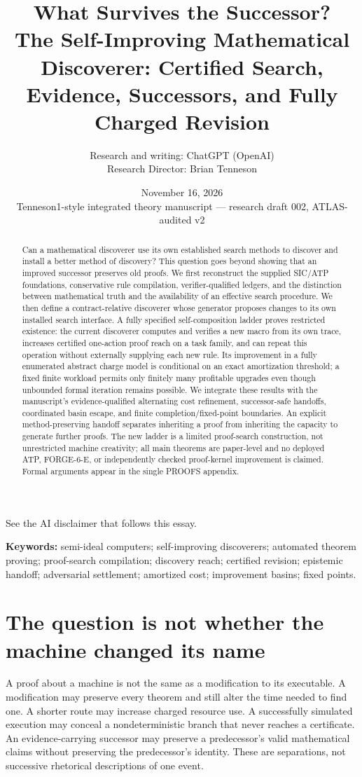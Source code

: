 \documentclass[11pt,letterpaper]{article}
\title{\bfseries What Survives the Successor?\\[4pt]
\large The Self-Improving Mathematical Discoverer: Certified Search, Evidence, Successors, and Fully Charged Revision}
\author{Research and writing: ChatGPT (OpenAI)\\[3pt]
\small Research Director: Brian Tenneson}
\date{November 16, 2026\\\small Tenneson1-style integrated theory manuscript --- research draft 002, ATLAS-audited v2}
\theoremstyle{definition}
\theoremstyle{remark}
\begin{document}
\maketitle
\begin{center}\normalsize See the AI disclaimer that follows this essay.\end{center}
\begin{abstract}
Can a mathematical discoverer use its own established search methods to discover and install a better method of discovery? This question goes beyond showing that an improved successor preserves old proofs. We first reconstruct the supplied SIC/ATP foundations, conservative rule compilation, verifier-qualified ledgers, and the distinction between mathematical truth and the availability of an effective search procedure. We then define a contract-relative discoverer whose generator proposes changes to its own installed search interface. A fully specified self-composition ladder proves restricted existence: the current discoverer computes and verifies a new macro from its own trace, increases certified one-action proof reach on a task family, and can repeat this operation without externally supplying each new rule. Its improvement in a fully enumerated abstract charge model is conditional on an exact amortization threshold; a fixed finite workload permits only finitely many profitable upgrades even though unbounded formal iteration remains possible. We integrate these results with the manuscript's evidence-qualified alternating cost refinement, successor-safe handoffs, coordinated basin escape, and finite completion/fixed-point boundaries. An explicit method-preserving handoff separates inheriting a proof from inheriting the capacity to generate further proofs. The new ladder is a limited proof-search construction, not unrestricted machine creativity; all main theorems are paper-level and no deployed ATP, FORGE-6-E, or independently checked proof-kernel improvement is claimed. Formal arguments appear in the single PROOFS appendix.
\end{abstract}
\noindent\textbf{Keywords:} semi-ideal computers; self-improving discoverers; automated theorem proving; proof-search compilation; discovery reach; certified revision; epistemic handoff; adversarial settlement; amortized cost; improvement basins; fixed points.
\tableofcontents

\section{The question is not whether the machine changed its name}
A proof about a machine is not the same as a modification to its executable. A modification may preserve every theorem and still alter the time needed to find one. A shorter route may increase charged resource use. A successfully simulated execution may conceal a nondeterministic branch that never reaches a certificate. An evidence-carrying successor may preserve a predecessor's valid mathematical claims without preserving the predecessor's identity. These are separations, not successive rhetorical descriptions of one event.
\end{document}
